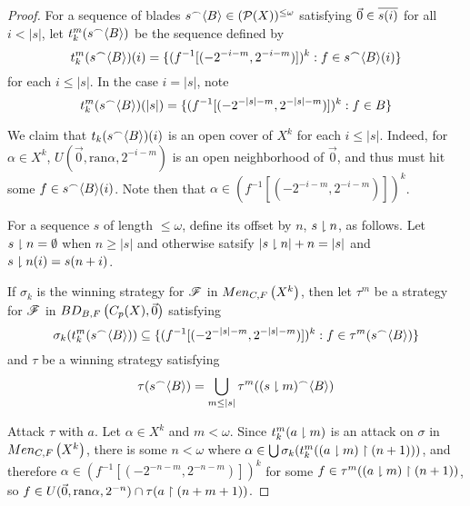 \documentclass[11pt]{article}
\begin{document}
  \begin{proof}
    For a sequence of blades
    \(s{^\frown}\langle B\rangle\in(\mathcal{P}(X))^{\leq\omega}\) satisfying
    \(\vec 0\in \overline{s(i)}\) for all \(i<|s|\), let
    \(t_k^m(s{^\frown}\langle B\rangle)\) be the sequence defined by
      \[
        t_k^m(s{^\frown}\langle B\rangle)(i)
          =
        \{
          (f^{-1}[(-2^{-i-m},2^{-i-m})])^k
        :
          f\in s{^\frown}\langle B\rangle(i)
        \}
      \]
    for each \(i\leq|s|\). In the case \(i=|s|\), note
      \[
        t_k^m(s{^\frown}\langle B\rangle)(|s|)
          =
        \{
          (f^{-1}[(-2^{-|s|-m},2^{-|s|-m})])^k
        :
          f\in B
        \}
      \]

    We claim that \(t_k(s{^\frown}\langle B\rangle)(i)\) is an open cover of \(X^k\) for
    each \(i\leq|s|\).
    Indeed, for \(\alpha\in X^k\), \(U(\vec 0,\text{ran}\alpha,2^{-i-m})\) is
    an open neighborhood of \(\vec 0\), and thus must hit some
    \(f\in s{^\frown}\langle B\rangle(i)\). Note then that
    \(\alpha\in(f^{-1}[(-2^{-i-m},2^{-i-m})])^k\).

    For a sequence \(s\) of length \(\leq\omega\), define its offset by
    \(n\), \(s\downharpoonright n\), as follows. Let
    \(s\downharpoonright n=\emptyset\) when \(n\geq|s|\) and otherwise
    satsify \(|s\downharpoonright n|+n=|s|\) and \(s\downharpoonright n(i)=s(n+i)\).

    If \(\sigma_k\) is the winning strategy for \(\mathscr{F}\) in \(Men_{C,F}\left({X^k}\right)\),
    then let \(\tau^m\) be a strategy for \(\mathscr{F}\) in
    \(BD_{B,F}\left({C_p(X)},{\vec 0}\right)\) satisfying
      \[
        \sigma_k(t_k^m(s{^\frown}\langle B\rangle))
          \subseteq
        \{
          (f^{-1}[(-2^{-|s|-m},2^{-|s|-m})])^k
        :
          f\in \tau^m(s{^\frown}\langle B\rangle)
        \}
      \]
    and \(\tau\) be a winning strategy satisfying
      \[
        \tau(s{^\frown}\langle B\rangle)
          =
        \bigcup_{m\leq|s|}
        \tau^m((s\downharpoonright m){^\frown}\langle B\rangle)
      \]

    Attack \(\tau\) with \(a\). Let \(\alpha\in X^k\) and \(m<\omega\).
    Since \(t_k^m(a\downharpoonright m)\) is an attack on \(\sigma\) in
    \(Men_{C,F}\left({X^k}\right)\), there is some \(n<\omega\) where
    \(\alpha\in\bigcup\sigma_k(t_k^m((a\downharpoonright m)\restriction(n+1)))\),
    and therefore \(\alpha\in (f^{-1}[(-2^{-n-m},2^{-n-m})])^k\) for
    some \(f\in\tau^m((a\downharpoonright m)\restriction(n+1))\), so
    \(
      f
        \in
      U(\vec 0,\text{ran}\alpha,2^{-n})
        \cap
      \tau(a\restriction(n+m+1))
    \).
  \end{proof}

\newpage


\end{document}
